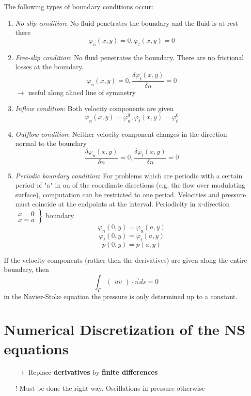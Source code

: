 \documentclass[a4paper,11pt]{scrartcl}
\begin{document}
The following types of boundary conditions occur:
\begin{enumerate}
	\item \textit{No-slip condition}: No fluid penetrates the boundary and the fluid is at rest there
	\[ \varphi_n(x,y) = 0, \varphi_t(x,y)=0\]
	\item \textit{Free-slip condition}: No fluid penetrates the boundary. There are no frictional losses at the boundary.
	\[ \varphi_n (x,y)= 0, \frac{\delta \varphi_t(x,y)}{\delta n} = 0 \]
	$\rightarrow$ useful along alined line of symmetry
	\item \textit{Inflow condition}: Both velocity components are given
	\[ \varphi_n(x,y) = \varphi_n^0, \varphi_t(x,y) = \varphi_t^0\]
	\item \textit{Outflow condition}: Neither velocity component changes in the direction normal to the boundary
	\[ \frac{\delta \varphi_n(x,y)}{\delta n} = 0, \frac{\delta \varphi_t(x,y)}{\delta n} = 0\]
	\item \textit{Periodic boundary condition}: For problems which are periodic with a certain period of "a" in on of the coordinate directions (e.g. the flow over modulating surface), computation can be restricted to one period. Velocities and pressure must coincide at the endpoints at the interval. Periodicity in x-direction $\left.\begin{matrix}
	x = 0\\
	x=a
	\end{matrix}\right\rbrace$ boundary
	\[\varphi_n (0, y) = \varphi_n(a,y)\]
	\[ \varphi_t(0,y) = \varphi_t(a,y)\]
	\[ p (0, y) = p(a,y)\]
	
\end{enumerate}

If the velocity components (rather then the derivatives) are given along the entire boundary, then
\[ \int_\Gamma \begin{pmatrix}
u
v
\end{pmatrix} \cdot \vec{n} ds = 0\]
in the Navier-Stoke equation the pressure is only determined up to a constant.


\section{Numerical Discretization of the NS equations}
\begin{itemize}
	\item[$\rightarrow$] Replace \textbf{derivatives} by \textbf{finite differences}
	\item[!] Must be done the right way. Oscillations in pressure otherwise
\end{itemize}
\end{document}

